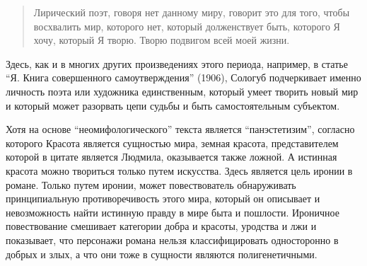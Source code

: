 \documentclass[12pt,a4paper]{article}
\begin{document}
\begin{quote}
 Лирический поэт, говоря нет данному миру, говорит это для того, чтобы восхвалить мир, которого нет, который долженствует быть, которого Я хочу, который Я творю. Творю подвигом всей моей жизни. 
 
\parencite[170.]{sologub1991}
 \end{quote}
 
 Здесь, как и в многих других произведениях этого периода, например, в статье \enquote{Я. Книга совершенного самоутверждения} (1906),  Сологуб подчеркивает именно личность поэта или художника единственным, который умеет творить новый мир и который может разорвать цепи судьбы и быть самостоятельным субъектом.


Хотя на основе \enquote{неомифологического} текста является \enquote{панэстетизим}, согласно которого Красота является сущностью мира, земная красота, представителем которой в цитате является Людмила, оказывается также ложной. А истинная красота можно твориться только путем искусства. Здесь является цель иронии в романе. Только путем иронии, может повествователь обнаруживать принципиальную противоречивость этого мира, который он описывает и невозможность найти истинную правду в мире быта и пошлости. Ироничное повествование смешивает категории добра и красоты, уродства и лжи и показывает, что персонажи романа нельзя классифицировать односторонно в добрых и злых, а что они тоже в сущности являются полигенетичными.  







\end{document}
